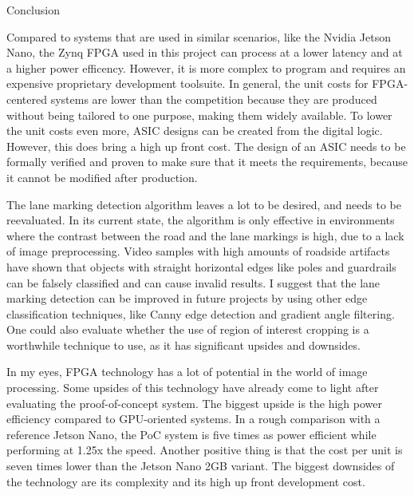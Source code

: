 \documentclass{matthijs}
\begin{document}
	\begin{hoofdstuk}{Conclusion}

		Compared to systems that are used in similar scenarios, like the Nvidia Jetson Nano, the Zynq FPGA used in this project can process at a lower latency and at a higher power efficency.
		However, it is more complex to program and requires an expensive proprietary development toolsuite.
		In general, the unit costs for FPGA-centered systems are lower than the competition because they are produced without being tailored to one purpose, making them widely available.
		To lower the unit costs even more, ASIC designs can be created from the digital logic.
		However, this does bring a high up front cost.
		The design of an ASIC needs to be formally verified and proven to make sure that it meets the requirements, because it cannot be modified after production.

		\bigskip

		The lane marking detection algorithm leaves a lot to be desired, and needs to be reevaluated.
		In its current state, the algorithm is only effective in environments where the contrast between the road and the lane markings is high, due to a lack of image preprocessing.
		Video samples with high amounts of roadside artifacts have shown that objects with straight horizontal edges like poles and guardrails can be falsely classified and can cause invalid results.
		I suggest that the lane marking detection can be improved in future projects by using other edge classification techniques, like Canny edge detection and gradient angle filtering.
		One could also evaluate whether the use of region of interest cropping is a worthwhile technique to use, as it has significant upsides and downsides.


		\bigskip

		In my eyes, FPGA technology has a lot of potential in the world of image processing.
		Some upsides of this technology have already come to light after evaluating the proof-of-concept system.
		The biggest upside is the high power efficiency compared to GPU-oriented systems.
		In a rough comparison with a reference Jetson Nano, the PoC system is five times as power efficient while performing at 1.25x the speed.
		Another positive thing is that the cost per unit is seven times lower than the Jetson Nano 2GB variant.
		The biggest downsides of the technology are its complexity and its high up front development cost.

	\end{hoofdstuk}

%
%

	\makelastpage
\end{document}
